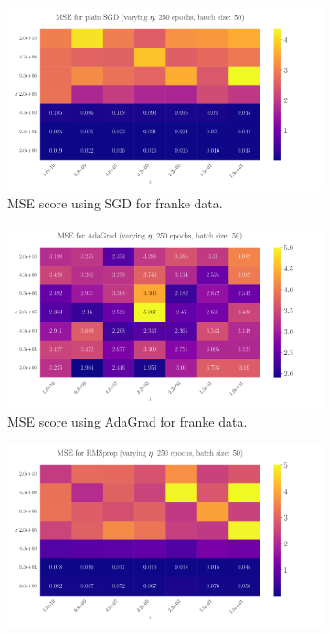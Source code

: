 \documentclass[%
reprint,s
amsmath,amssymb,
aps,
]{revtex4-2}
\begin{document}
\begin{figure}
	\begin{subfigure}{0.41\textwidth}
		\includegraphics[width=\textwidth]{Figures/LinRegPlainSGD_250epochs_batchS50.pdf}
		\caption{MSE score using SGD for franke data.}
		\label{fig:LinReg25x25_epoch10_bacthS50}
	\end{subfigure}
	\hfill
	\begin{subfigure}{0.41\textwidth}
		\includegraphics[width=\textwidth]{Figures/LinRegAdaGrad_250epochs_batchS50.pdf}
		\caption{MSE score using AdaGrad for franke data.}
		\label{fig:LinReg25x25_epoch10_bacthS50_zoomed}
	\end{subfigure}
\hfill\newline
	\begin{subfigure}{0.41\textwidth}
		\includegraphics[width=\textwidth]{Figures/LinRegRMSprop_250epochs_batchS50.pdf}

\end{subfigure}
\end{figure}
\end{document}
